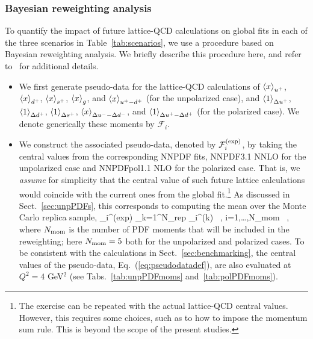 \subsubsection{Bayesian reweighting analysis}
\label{sec:projections:rw}

To quantify the impact of future lattice-QCD calculations on global fits 
in each of the three scenarios in Table~\ref{tab:scenarios},
we use a procedure based on Bayesian reweighting analysis.
%
We briefly describe this procedure here, and refer 
to~\cite{Ball:2011gg,Ball:2010gb} for additional details.

\begin{itemize}

\item We first generate pseudo-data for the lattice-QCD calculations
of $\left\langle x\right\rangle_{u^+}$, $\left\langle x\right\rangle_{d^+}$, $\left\langle x\right\rangle_{s^+}$,
$\left\langle x\right\rangle_{g}$, and $\left\langle x\right\rangle_{u^+-d^+}$ (for the unpolarized case), and
$\left\langle 1\right\rangle_{\Delta u^+}$, $\left\langle 1\right\rangle_{\Delta d^+}$,
$\left\langle 1\right\rangle_{\Delta s^+}$, $\left\langle x\right\rangle_{\Delta u^--\Delta d^-}$, and
$\left\langle 1\right\rangle_{\Delta u^+ - \Delta d^+}$ (for the polarized case).
%
We denote generically these moments by $\mathcal{F}_i$.
  
\item We construct the associated pseudo-data, denoted by 
$\mathcal{F}_i^{\rm (exp)}$, by taking the central values from
the corresponding NNPDF fits, NNPDF3.1 NNLO for the unpolarized case and 
NNPDFpol1.1 NLO for the polarized case.
%
That is, we {\it assume} for simplicity that the central value
of such future lattice calculations would coincide with the current ones
from the global fit.\footnote{ The exercise can be repeated
 with the actual lattice-QCD central values. However, this 
 requires some choices, such as to how to impose 
 the momentum sum rule.
 This is beyond the scope of the present studies.}
%
As discussed in Sect.~\ref{sec:unpPDFs}, this corresponds to computing
the mean over the Monte Carlo replica sample,
\be
\label{eq:pseudodatadef}
_i^{\rm (exp)} \equiv {}\sum_{k=1}^{N_{\rm rep}}
_i^{\rm (k)} \, , \quad i=1,\ldots,N_{\rm mom} \, ,
\ee
where $N_{\rm mom}$ is the number of PDF moments that will be included
in the reweighting; here $N_{\rm mom}=5$ both for the unpolarized and 
polarized cases.
%
To be consistent with the calculations in Sect.~\ref{sec:benchmarking},
the central values of the pseudo-data, Eq.~(\ref{eq:pseudodatadef}),
are also evaluated at $Q^2=4$ GeV$^2$ 
(see Tabs.~\ref{tab:unpPDFmoms} and~\ref{tab:polPDFmoms}).


\end{itemize}
